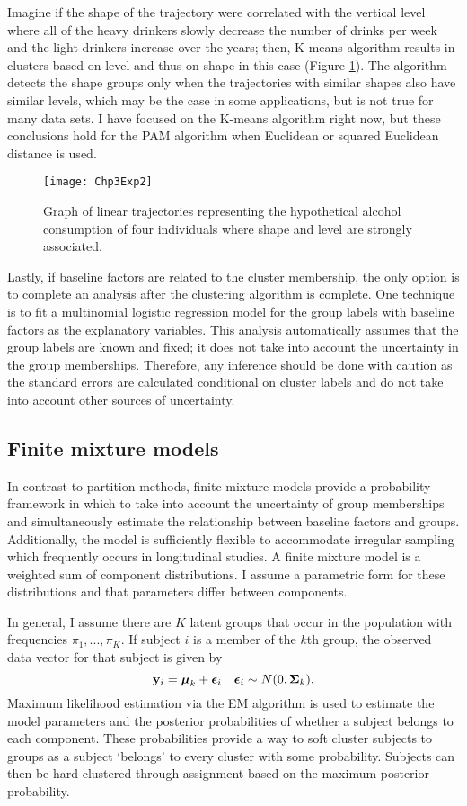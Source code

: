 Imagine if the shape of the trajectory were correlated with the vertical level where all of the heavy drinkers slowly decrease the number of drinks per week and the light drinkers increase over the years; then, K-means algorithm results in clusters based on level and thus on shape in this case (Figure \ref{fig:3-2}). The algorithm detects the shape groups only when the trajectories with similar shapes also have similar levels, which may be the case in some applications, but is not true for many data sets. I have focused on the K-means algorithm right now, but these conclusions hold for the PAM algorithm when Euclidean or squared Euclidean distance is used.
\begin{figure}[ht]
\centering
\texttt{[image: Chp3Exp2]}
\caption{Graph of linear trajectories representing the hypothetical alcohol consumption of four individuals where shape and level are strongly associated.}
\label{fig:3-2} 
\end{figure}

Lastly, if baseline factors are related to the cluster membership, the only option is to complete an analysis after the clustering algorithm is complete. One technique is to fit a multinomial logistic regression model for the group labels with baseline factors as the explanatory variables. This analysis automatically assumes that the group labels are known and fixed; it does not take into account the uncertainty in the group memberships. Therefore, any inference should be done with caution as the standard errors are calculated conditional on cluster labels and do not take into account other sources of uncertainty.

\subsection{Finite mixture models}
In contrast to partition methods, finite mixture models provide a probability framework in which to take into account the uncertainty of group memberships and simultaneously estimate the relationship between baseline factors and groups. Additionally, the model is sufficiently flexible to accommodate irregular sampling which frequently occurs in longitudinal studies. A finite mixture model is a weighted sum of component distributions. I assume a parametric form for these distributions and that parameters differ between components.

In general, I assume there are $K$ latent groups that occur in the population with frequencies $\pi_{1},...,\pi_{K}$. If subject $i$ is a member of the $k$th group, the observed data vector for that subject is given by
$$\mathbf y_{i} = \boldsymbol\mu_{k}+\boldsymbol\epsilon_{i}\quad \boldsymbol\epsilon_{i} \sim N(0,\boldsymbol\Sigma_{k}).$$
Maximum likelihood estimation via the EM algorithm is used to estimate the model parameters and the posterior probabilities of whether a subject belongs to each component. These probabilities provide a way to soft cluster subjects to groups as a subject `belongs' to every cluster with some probability. Subjects can then be hard clustered through assignment based on the maximum posterior probability. 

